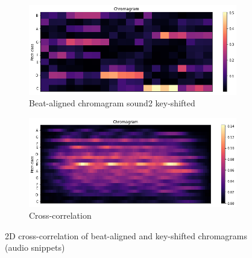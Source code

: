 \begin{figure}[htbp]
{{			\begin{subfigure}{.495\textwidth}
				\centering     
				\includegraphics[scale=0.3]{Images/Chroma/beatalignedchroma2_ks.png}
				\caption{Beat-aligned chromagram sound2 key-shifted}
				\label{cks2}
			\end{subfigure}%
			\begin{subfigure}{.495\textwidth}
				\centering     
				\includegraphics[scale=0.3]{Images/Chroma/beatalignedchroma_corr.png}
				\caption{Cross-correlation}
				\label{c2}
			\end{subfigure}%
	}}
	\caption{2D cross-correlation of beat-aligned and key-shifted chromagrams (audio snippets)}
	\label{fig:beatalign}
\end{figure}

